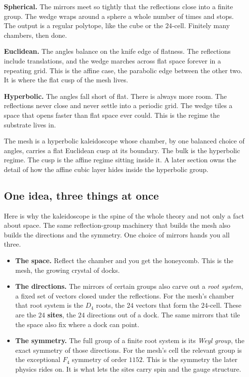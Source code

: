 \textbf{Spherical.} The mirrors meet so tightly that the reflections close into a finite group. The wedge wraps around a sphere a whole number of times and stops. The output is a regular polytope, like the cube or the $24$-cell. Finitely many chambers, then done.

\textbf{Euclidean.} The angles balance on the knife edge of flatness. The reflections include translations, and the wedge marches across flat space forever in a repeating grid. This is the affine case, the parabolic edge between the other two. It is where the flat cusp of the mesh lives.

\textbf{Hyperbolic.} The angles fall short of flat. There is always more room. The reflections never close and never settle into a periodic grid. The wedge tiles a space that opens faster than flat space ever could. This is the regime the substrate lives in.

The mesh is a hyperbolic kaleidoscope whose chamber, by one balanced choice of angles, carries a flat Euclidean cusp at its boundary. The bulk is the hyperbolic regime. The cusp is the affine regime sitting inside it. A later section owns the detail of how the affine cubic layer hides inside the hyperbolic group.

\subsection{One idea, three things at once}

Here is why the kaleidoscope is the spine of the whole theory and not only a fact about space. The same reflection-group machinery that builds the mesh also builds the directions and the symmetry. One choice of mirrors hands you all three.

\begin{itemize}
\item \textbf{The space.} Reflect the chamber and you get the honeycomb. This is the mesh, the growing crystal of docks.
\item \textbf{The directions.} The mirrors of certain groups also carve out a \emph{root system}, a fixed set of vectors closed under the reflections. For the mesh's chamber that root system is the $D_4$ roots, the $24$ vectors that form the $24$-cell. These are the $24$ \textbf{sites}, the $24$ directions out of a dock. The same mirrors that tile the space also fix where a dock can point.
\item \textbf{The symmetry.} The full group of a finite root system is its \emph{Weyl group}, the exact symmetry of those directions. For the mesh's cell the relevant group is the exceptional $F_4$ symmetry of order $1152$. This is the symmetry the later physics rides on. It is what lets the sites carry spin and the gauge structure.
\end{itemize}

